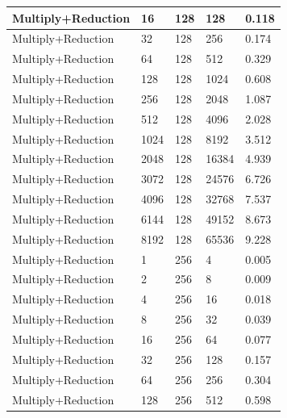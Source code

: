 \documentclass{article}
\begin{document}
\begin{longtable}{|l|l|l|l|l|}
Multiply+Reduction & 16   & 128         & 128               & 0.118             \\ \hline
Multiply+Reduction & 32   & 128         & 256               & 0.174             \\ \hline
Multiply+Reduction & 64   & 128         & 512               & 0.329             \\ \hline
Multiply+Reduction & 128  & 128         & 1024              & 0.608             \\ \hline
Multiply+Reduction & 256  & 128         & 2048              & 1.087             \\ \hline
Multiply+Reduction & 512  & 128         & 4096              & 2.028             \\ \hline
Multiply+Reduction & 1024 & 128         & 8192              & 3.512             \\ \hline
Multiply+Reduction & 2048 & 128         & 16384             & 4.939             \\ \hline
Multiply+Reduction & 3072 & 128         & 24576             & 6.726             \\ \hline
Multiply+Reduction & 4096 & 128         & 32768             & 7.537             \\ \hline
Multiply+Reduction & 6144 & 128         & 49152             & 8.673             \\ \hline
Multiply+Reduction & 8192 & 128         & 65536             & 9.228             \\ \hline
Multiply+Reduction & 1    & 256         & 4                 & 0.005             \\ \hline
Multiply+Reduction & 2    & 256         & 8                 & 0.009             \\ \hline
Multiply+Reduction & 4    & 256         & 16                & 0.018             \\ \hline
Multiply+Reduction & 8    & 256         & 32                & 0.039             \\ \hline
Multiply+Reduction & 16   & 256         & 64                & 0.077             \\ \hline
Multiply+Reduction & 32   & 256         & 128               & 0.157             \\ \hline
Multiply+Reduction & 64   & 256         & 256               & 0.304             \\ \hline
Multiply+Reduction & 128  & 256         & 512               & 0.598             \\ \hline

\end{longtable}
\end{document}
